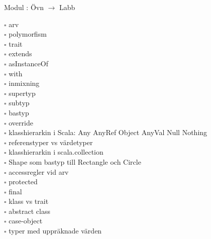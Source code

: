 
Modul : Övn  $\rightarrow$ Labb 
\begin{multicols}{3}\SlideFontTiny
$\square$ arv \\
$\square$ polymorfism \\
$\square$ trait \\
$\square$ extends \\
$\square$ asInstanceOf \\
$\square$ with \\
$\square$ inmixning \\
$\square$ supertyp \\
$\square$ subtyp \\
$\square$ bastyp \\
$\square$ override \\
$\square$ klasshierarkin i Scala: Any AnyRef Object AnyVal Null Nothing \\
$\square$ referenstyper vs värdetyper \\
$\square$ klasshierarkin i scala.collection \\
$\square$ Shape som bastyp till Rectangle och Circle \\
$\square$ accessregler vid arv \\
$\square$ protected \\
$\square$ final \\
$\square$ klass vs trait \\
$\square$ abstract class \\
$\square$ case-object \\
$\square$ typer med uppräknade värden \\     
\end{multicols}
